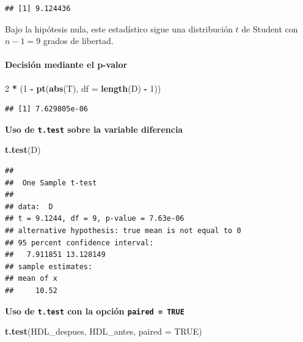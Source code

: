 \documentclass[
]{article}
\newenvironment{Shaded}{\begin{snugshade}}{\end{snugshade}}
\newcommand{\AttributeTok}[1]{\textcolor[rgb]{0.13,0.29,0.53}{#1}}
\newcommand{\ConstantTok}[1]{\textcolor[rgb]{0.56,0.35,0.01}{#1}}
\newcommand{\DecValTok}[1]{\textcolor[rgb]{0.00,0.00,0.81}{#1}}
\newcommand{\FunctionTok}[1]{\textcolor[rgb]{0.13,0.29,0.53}{\textbf{#1}}}
\newcommand{\NormalTok}[1]{#1}
\newcommand{\SpecialCharTok}[1]{\textcolor[rgb]{0.81,0.36,0.00}{\textbf{#1}}}
\begin{document}
\begin{verbatim}
## [1] 9.124436
\end{verbatim}

Bajo la hipótesis nula, este estadístico sigue una distribución \(t\) de Student con \(n-1 = 9\) grados de libertad.

\paragraph{Decisión mediante el p-valor}\label{decisiuxf3n-mediante-el-p-valor}

\begin{Shaded}
\begin{Highlighting}[]
\DecValTok{2} \SpecialCharTok{*}\NormalTok{ (}\DecValTok{1} \SpecialCharTok{{-}} \FunctionTok{pt}\NormalTok{(}\FunctionTok{abs}\NormalTok{(T), }\AttributeTok{df =} \FunctionTok{length}\NormalTok{(D) }\SpecialCharTok{{-}} \DecValTok{1}\NormalTok{))}
\end{Highlighting}
\end{Shaded}

\begin{verbatim}
## [1] 7.629805e-06
\end{verbatim}

\textbf{Uso de \texttt{t.test} sobre la variable diferencia}

\begin{Shaded}
\begin{Highlighting}[]
\FunctionTok{t.test}\NormalTok{(D)}
\end{Highlighting}
\end{Shaded}

\begin{verbatim}
## 
##  One Sample t-test
## 
## data:  D
## t = 9.1244, df = 9, p-value = 7.63e-06
## alternative hypothesis: true mean is not equal to 0
## 95 percent confidence interval:
##   7.911851 13.128149
## sample estimates:
## mean of x 
##     10.52
\end{verbatim}

\textbf{Uso de \texttt{t.test} con la opción \texttt{paired\ =\ TRUE}}

\begin{Shaded}
\begin{Highlighting}[]
\FunctionTok{t.test}\NormalTok{(HDL\_despues, HDL\_antes, }\AttributeTok{paired =} \ConstantTok{TRUE}\NormalTok{)}
\end{Highlighting}
\end{Shaded}
\end{document}
